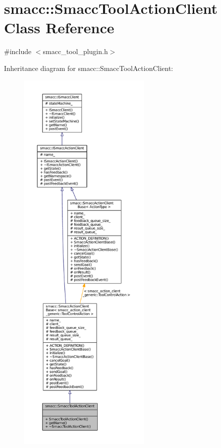 \hypertarget{classsmacc_1_1SmaccToolActionClient}{}\section{smacc\+:\+:Smacc\+Tool\+Action\+Client Class Reference}
\label{classsmacc_1_1SmaccToolActionClient}


{\ttfamily \#include $<$smacc\+\_\+tool\+\_\+plugin.\+h$>$}



Inheritance diagram for smacc\+:\+:Smacc\+Tool\+Action\+Client\+:
\nopagebreak
\begin{figure}[H]
\begin{center}
\leavevmode
\includegraphics[height=550pt]{classsmacc_1_1SmaccToolActionClient__inherit__graph}
\end{center}
\end{figure}



